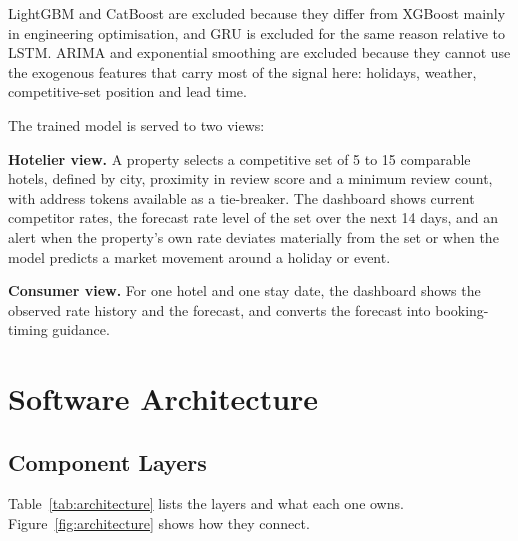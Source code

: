 LightGBM and CatBoost are excluded because they differ from XGBoost mainly in engineering optimisation, and GRU is excluded for the same reason relative to LSTM. ARIMA and exponential smoothing are excluded because they cannot use the exogenous features that carry most of the signal here: holidays, weather, competitive-set position and lead time.

The trained model is served to two views:

\textbf{Hotelier view.} A property selects a competitive set of 5 to 15 comparable hotels, defined by city, proximity in review score and a minimum review count, with address tokens available as a tie-breaker. The dashboard shows current competitor rates, the forecast rate level of the set over the next 14 days, and an alert when the property's own rate deviates materially from the set or when the model predicts a market movement around a holiday or event.

\textbf{Consumer view.} For one hotel and one stay date, the dashboard shows the observed rate history and the forecast, and converts the forecast into booking-timing guidance.

\section{Software Architecture}

\subsection{Component Layers}

Table~\ref{tab:architecture} lists the layers and what each one owns. Figure~\ref{fig:architecture} shows how they connect.

